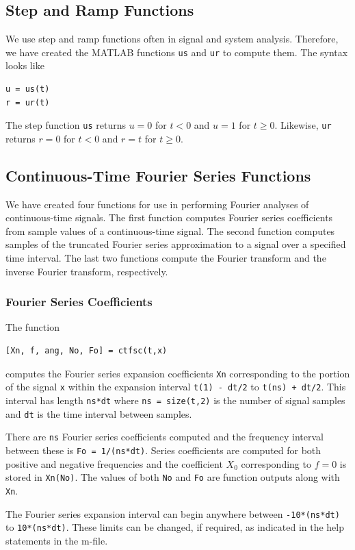 \subsection{Step and Ramp Functions}
We use step and ramp functions often in signal and system analysis.  Therefore, we have created the MATLAB functions \verb=us= and \verb=ur= to compute them.  The syntax looks like
\begin{verbatim}
u = us(t)
r = ur(t)
\end{verbatim}
The step function \verb=us= returns $u=0$ for $t<0$ and $u=1$ for $t\geq0$.  Likewise, \verb=ur= returns $r=0$ for $t<0$ and $r=t$ for $t\geq 0$.

\subsection{Continuous-Time Fourier Series Functions}
We have created four functions for use in performing Fourier analyses of continuous-time signals.  The first function computes Fourier series coefficients from sample values of a continuous-time signal.  The second function computes samples of the truncated Fourier series approximation to a signal over a specified time interval.  The last two functions compute the Fourier transform and the inverse Fourier transform, respectively.

\subsubsection{Fourier Series Coefficients}
The function
\begin{verbatim}
[Xn, f, ang, No, Fo] = ctfsc(t,x)
\end{verbatim}
computes the Fourier series expansion coefficients \verb=Xn= corresponding to the portion of the signal \verb=x= within the expansion interval \verb=t(1) - dt/2= to \verb=t(ns) + dt/2=.  This interval has length \verb=ns*dt= where \verb#ns = size(t,2)# is the number of signal samples and \verb=dt= is the time interval between samples.
\par
There are \verb=ns= Fourier series coefficients computed and the frequency interval between these is \verb#Fo = 1/(ns*dt)#.  Series coefficients are computed for both positive and negative frequencies and the coefficient $X_0$ corresponding to $f = 0$ is stored in \verb=Xn(No)=.  The values of both \verb=No= and \verb=Fo= are function outputs along with \verb=Xn=.
\par
The Fourier series expansion interval can begin anywhere between \verb=-10*(ns*dt)= to \verb=10*(ns*dt)=.  These limits can be changed, if required, as indicated in the help statements in the m-file.

